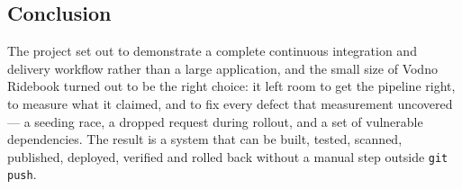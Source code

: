 \documentclass[10pt,a4paper]{article}
\newcommand{\cd}[1]{\texttt{\small #1}}
\begin{document}
\subsection{Conclusion}

The project set out to demonstrate a complete continuous integration and
delivery workflow rather than a large application, and the small size of Vodno
Ridebook turned out to be the right choice: it left room to get the pipeline
right, to measure what it claimed, and to fix every defect that measurement
uncovered --- a seeding race, a dropped request during rollout, and a set of
vulnerable dependencies. The result is a system that can be built, tested,
scanned, published, deployed, verified and rolled back without a manual step
outside \cd{git push}.
\end{document}
